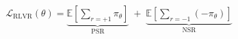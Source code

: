 \documentclass[preview]{standalone}
\begin{document}
\begin{align*}
\mathcal{L}_{\mathrm{RLVR}}(\theta) = \underbrace{\mathbb{E}\!\left[\sum_{r=+1}\pi_\theta\right]}_{\text{ PSR }}\;+\;\underbrace{\mathbb{E}\!\left[\sum_{r=-1}(-\pi_\theta)\right]}_{\text{ NSR }}
\end{align*}
\end{document}
